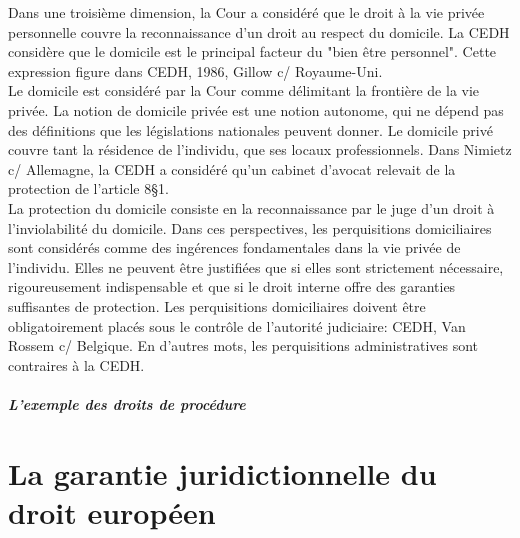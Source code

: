 \documentclass[10pt, a4paper, openany]{book}
\begin{document}
Dans une troisième dimension, la Cour a considéré que le droit à la vie privée personnelle couvre la reconnaissance d'un droit au respect du domicile. La CEDH considère que le domicile est le principal facteur du "bien être personnel". Cette expression figure dans CEDH, 1986, Gillow c/ Royaume-Uni. \\
Le domicile est considéré par la Cour comme délimitant la frontière de la vie privée. La notion de domicile privée est une notion autonome, qui ne dépend pas des définitions que les législations nationales peuvent donner. Le domicile privé couvre tant la résidence de l'individu, que ses locaux professionnels. Dans Nimietz c/ Allemagne, la CEDH a considéré qu'un cabinet d'avocat relevait de la protection de l'article 8§1. \\
La protection du domicile consiste en la reconnaissance par le juge d'un droit à l'inviolabilité du domicile. Dans ces perspectives, les perquisitions domiciliaires sont considérés comme des ingérences fondamentales dans la vie privée de l'individu. Elles ne peuvent être justifiées que si elles sont strictement nécessaire, rigoureusement indispensable et que si le droit interne offre des garanties suffisantes de protection. Les perquisitions domiciliaires doivent être obligatoirement placés sous le contrôle de l'autorité judiciaire: CEDH, Van Rossem c/ Belgique. En d'autres mots, les perquisitions administratives sont contraires à la CEDH. 








\subsubsection{L'exemple des droits de procédure}








\part{La garantie juridictionnelle du droit européen}
\end{document}
